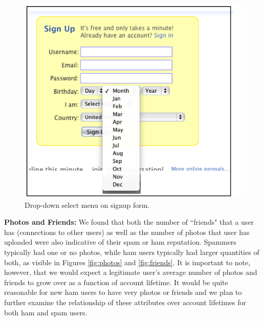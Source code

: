 \documentclass[preprint]{acm_proc_article-sp}
\begin{document}
\begin{figure}[h]
    \centering
    \includegraphics[width=\linewidth]{figures/dropdown.png}
    \caption{Drop-down select menu on signup form.}
    \label{fig:drop}
\end{figure}

\textbf{Photos and Friends:} We found that both the number of ``friends" that a user has (connections 
to other users) as well as the number of photos that user has uploaded were also indicative of their 
spam or ham reputation. Spammers typically had one or no photos, while ham users typically had larger 
quantities of both, as visible in Figures \ref{fig:photos} and \ref{fig:friends}. It is important to note, 
however, that we would expect a legitimate user's average number of photos and friends to grow over 
as a function of account lifetime. It would be quite reasonable for new ham users to have very photos 
or friends and we plan to further examine the relationship of these attributes over account lifetimes 
for both ham and spam users.
\end{document}
